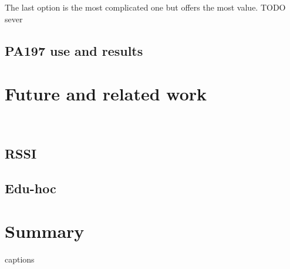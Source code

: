 \documentclass[
  print, %
  Table,   %
  nolof,     %
  nolot,     %
           oneside
]{fithesis3}
\begin{document}
  The last option is the most complicated one but offers the most value.
  TODO sever

  \section{PA197 use and results} \label{sec:PA197}

\chapter{Future and related work}\
  \section{RSSI}
  \section{Edu-hoc}
\chapter{Summary}




{\csname captions\languagename\endcsname %
\makeatletter %
  \thesis@selectLocale{\thesis@locale}\makeatother
\printbibliography[heading=bibintoc]} %

\appendix %
\end{document}
